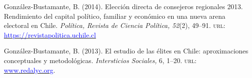 \begin{publications}
\begin{benumerate}{14}

\item{\small González-Bustamante, B. (2014). Elección directa de consejeros regionales 2013. Rendimiento del capital político, familiar y económico en una nueva arena electoral en Chile. {\itshape Política, Revista de Ciencia Política, 52}(2), 49--91. {\scshape url:} \href{https://revistapolitica.uchile.cl/index.php/RP/article/view/36137}{\textcolor{blue}{https://revistapolitica.uchile.cl}}} \vspace{1mm}


\item{\small González-Bustamante, B. (2013). El estudio de las élites en Chile: aproximaciones conceptuales y metodológicas. {\itshape Intersticios Sociales,} 6, 1--20. {\scshape url:} \href{https://www.redalyc.org/articulo.oa?id=421739499004}{\textcolor{blue}{www.redalyc.org}}.} \vspace{1mm}



\end{benumerate}
\end{publications}
